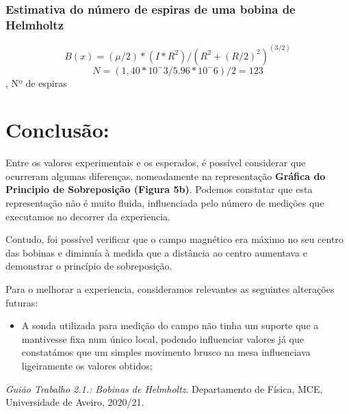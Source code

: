 \subsection*{Estimativa do número de espiras de uma bobina de Helmholtz}

\begin{equation}
B(x)=( \mu /2)*(I*R^2)/(R^2 + (R/2)^2 )^(3/2)
\end{equation}
\begin{equation}
N = (1,40*10^-3/5.96*10^-6) /2 = 123 
\end{equation} , \centering Nº de espiras

\flushleft
\chapter*{Conclusão:}
\par Entre os valores experimentais e os esperados, é possível considerar que ocurreram algumas diferenças, nomeadamente na representação \textbf{Gráfica do Principio de Sobreposição (Figura 5b)}. Podemos constatar que esta representação não é muito fluida, influenciada pelo número de medições que executamos no decorrer da experiencia.
\par Contudo, foi possível verificar que o campo magnético era máximo no seu centro das bobinas e diminuía à medida que a distância ao centro aumentava e demonstrar o princípio de sobreposição.
\par Para o melhorar a experiencia, consideramos relevantes as seguintes alterações futuras:
\begin{itemize}
\item A sonda utilizada para medição do campo não tinha um suporte que a mantivesse fixa num único local, podendo influenciar valores já que constatámos que um simples movimento brusco na mesa influenciava ligeiramente os valores obtidos;
\end{itemize}

\begin{thebibliography}{9}


\textit{Guião Trabalho 2.1.: Bobinas de Helmholtz}. 
Departamento de Física, MCE, Universidade de Aveiro, 2020/21.

\end{thebibliography}
